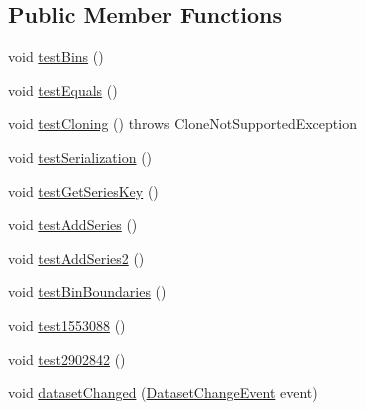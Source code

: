 \subsection*{Public Member Functions}
\begin{DoxyCompactItemize}
\item 
void \mbox{\hyperlink{classorg_1_1jfree_1_1data_1_1statistics_1_1_histogram_dataset_test_a38c96a6b2dbe9ec3f71500435d5658be}{test\+Bins}} ()
\item 
void \mbox{\hyperlink{classorg_1_1jfree_1_1data_1_1statistics_1_1_histogram_dataset_test_aa4c8fec7aaa4b84dfe276ce4cf8b7ec2}{test\+Equals}} ()
\item 
void \mbox{\hyperlink{classorg_1_1jfree_1_1data_1_1statistics_1_1_histogram_dataset_test_a0ceab02bee90639c4ab301ce8b2e8b11}{test\+Cloning}} ()  throws Clone\+Not\+Supported\+Exception 
\item 
void \mbox{\hyperlink{classorg_1_1jfree_1_1data_1_1statistics_1_1_histogram_dataset_test_a6b52efaa050fdc67ce8817027d86732a}{test\+Serialization}} ()
\item 
void \mbox{\hyperlink{classorg_1_1jfree_1_1data_1_1statistics_1_1_histogram_dataset_test_a8e251428ec7c769f4ddea4d77b7399f9}{test\+Get\+Series\+Key}} ()
\item 
void \mbox{\hyperlink{classorg_1_1jfree_1_1data_1_1statistics_1_1_histogram_dataset_test_a26f2c71ac76339a055fb76b303d01349}{test\+Add\+Series}} ()
\item 
void \mbox{\hyperlink{classorg_1_1jfree_1_1data_1_1statistics_1_1_histogram_dataset_test_ac6f55e4f8d70c6125e19cdb239332288}{test\+Add\+Series2}} ()
\item 
void \mbox{\hyperlink{classorg_1_1jfree_1_1data_1_1statistics_1_1_histogram_dataset_test_aeb4a869af0a8a752d7e7eaee81411441}{test\+Bin\+Boundaries}} ()
\item 
void \mbox{\hyperlink{classorg_1_1jfree_1_1data_1_1statistics_1_1_histogram_dataset_test_a8d7b70e69879a79b7214a60ca0804116}{test1553088}} ()
\item 
void \mbox{\hyperlink{classorg_1_1jfree_1_1data_1_1statistics_1_1_histogram_dataset_test_aab1cd52bd9e12430a423f81968b04a11}{test2902842}} ()
\item 
void \mbox{\hyperlink{classorg_1_1jfree_1_1data_1_1statistics_1_1_histogram_dataset_test_a11232792d7a1f26177de568009b95679}{dataset\+Changed}} (\mbox{\hyperlink{classorg_1_1jfree_1_1data_1_1general_1_1_dataset_change_event}{Dataset\+Change\+Event}} event)
\end{DoxyCompactItemize}


